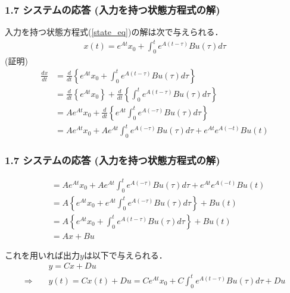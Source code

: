 \documentclass[10pt]{beamer}
\begin{document}
\begin{frame}[t]
\frametitle{1.7 システムの応答 (入力を持つ状態方程式の解)}
入力を持つ状態方程式(\ref{state_eq})の解は次で与えられる．
\begin{align}
  x(t) = e^{At} x_0 + \int_0^t e^{A(t-\tau)} B u (\tau) d \tau
  
\end{align}
(証明)
\begin{align}
  \frac{dx}{dt}
  &=\frac{d}{dt} \left\{ e^{At} x_0 + \int_0^t e^{A(t-\tau)} B u (\tau) d \tau \right\}
\nonumber \\
  &=\frac{d}{dt} \left\{ e^{At} x_0 \right\}
    +\frac{d}{dt} \left\{ \int_0^t e^{A(t-\tau)} B u (\tau) d \tau \right\}
\nonumber\\
  &= A e^{At} x_0 + \frac {d}{dt} \left\{ e^{At} \int_0^t e^{A(-\tau)} B u (\tau) d \tau \right\}
\nonumber\\
  &= A e^{At} x_0 +  A e^{At} \int_0^t e^{A(-\tau)} B u (\tau) d \tau
        + e^{At}  e^{A(-t)} B u (t)\nonumber
\end{align}
\end{frame}


\begin{frame}[t]
\frametitle{1.7 システムの応答 (入力を持つ状態方程式の解)}
 

\begin{align}
  &= A e^{At} x_0 +  A e^{At} \int_0^t e^{A(-\tau)} B u (\tau) d \tau
        + e^{At}  e^{A(-t)} B u (t)
\nonumber\\
  &= A \left\{ e^{At} x_0 +  e^{At} \int_0^t e^{A(-\tau)} B u (\tau) d \tau \right\}
        +  B u (t)
\nonumber \\
  &= A \left\{ e^{At} x_0 +  \int_0^t e^{A(t-\tau)} B u (\tau) d \tau \right\}
        +  B u (t)
\nonumber\\
  & = Ax + Bu
\end{align}

これを用いれば出力$y$は以下で与えられる．
\begin{align}
  &y = Cx + Du \nonumber \\
  \Rightarrow \ \ \ \ \ &y(t)= Cx(t)+Du = Ce^{At} x_0 + C\int_0^t e^{A(t-\tau)} B u (\tau) d \tau + Du

\end{align}
\end{frame}
\end{document}
